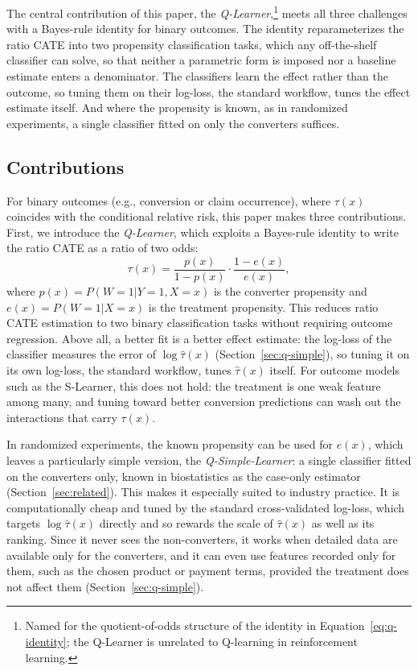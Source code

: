 \documentclass{article}
\begin{document}
The central contribution of this paper, the
\emph{Q-Learner},\footnote{Named for the quotient-of-odds structure of
the identity in Equation~\eqref{eq:q-identity}; the Q-Learner is
unrelated to Q-learning in reinforcement learning.} meets all three challenges with a Bayes-rule identity for binary outcomes.
The identity reparameterizes the ratio CATE into two propensity
classification tasks, which any off-the-shelf classifier can solve, so that
neither a parametric form is imposed nor a baseline estimate enters a
denominator. The classifiers learn the effect rather than the outcome, so
tuning them on their log-loss, the standard workflow, tunes the effect
estimate itself. And where the propensity is known, as in randomized
experiments, a single classifier fitted on only the converters suffices.

\subsection{Contributions}

For binary outcomes (e.g., conversion or claim occurrence), where
$\tau(x)$ coincides with the conditional relative risk, this paper
makes three contributions. First, we
introduce the \emph{Q-Learner}, which exploits a Bayes-rule identity to
write the ratio CATE as a ratio of two odds:
\begin{equation*}
\tau(x) = \frac{p(x)}{1-p(x)} \cdot \frac{1-e(x)}{e(x)},
\end{equation*}
where $p(x) = P(W{=}1|Y{=}1,X{=}x)$ is the converter propensity and
$e(x) = P(W{=}1|X{=}x)$ is the treatment propensity.
This reduces ratio CATE estimation to two binary classification
tasks without requiring outcome regression. Above all, a better fit is
a better effect estimate: the log-loss of the classifier measures the
error of $\log\hat\tau(x)$ (Section~\ref{sec:q-simple}), so tuning it on
its own log-loss, the standard workflow, tunes $\hat\tau(x)$ itself. For outcome models such as the
S-Learner, this does not hold: the treatment is one weak feature among
many, and tuning toward better conversion predictions can wash out the
interactions that carry $\tau(x)$.

In randomized experiments, the known propensity can be used for $e(x)$,
which leaves a particularly simple version, the \emph{Q-Simple-Learner}: a
single classifier fitted on the converters only, known in biostatistics as
the case-only estimator \citep{vittinghoff2006case, dai2018case}
(Section~\ref{sec:related}). This makes it especially suited to industry
practice. It is computationally cheap and tuned by the
standard cross-validated log-loss, which targets $\log\hat\tau(x)$ directly
and so rewards the scale of $\hat\tau(x)$ as well as its ranking. Since it
never sees the non-converters, it works when detailed data are available
only for the converters, and it can even use features recorded only for
them, such as the chosen product or payment terms, provided the treatment
does not affect them (Section~\ref{sec:q-simple}).
\end{document}
